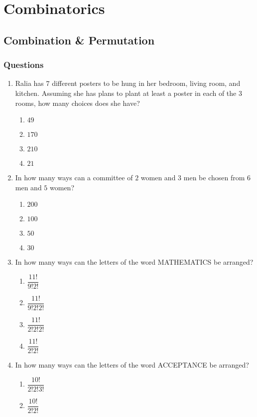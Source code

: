\chapter{Combinatorics}
\section{Combination \& Permutation}
\subsection{Questions}
\begin{multicols}{2}
\begin{enumerate}[label={\arabic*.}]
\item Ralia has \(7\) different posters to be hung in her bedroom, living room, and kitchen. Assuming she has plans to plant at least a poster in each of the \(3\) rooms, how many choices does she have?
	\begin{enumerate}[label={\Alph*.}]
	\item \(49\)
	\item \(170\)
	\item \(210\)
	\item \(21\)
	\end{enumerate}
\item In how many ways can a committee of \(2\) women and \(3\) men be chosen from \(6\) men and \(5\) women?
	\begin{enumerate}[label={\Alph*.}]
	\item \(200\)
	\item \(100\)
	\item \(50\)
	\item \(30\)
	\end{enumerate}
\item In how many ways can the letters of the word MATHEMATICS be arranged?
	\begin{enumerate}[label={\Alph*.}]
	\item \(\dfrac{11!}{9!2!}\)
	\item \(\dfrac{11!}{9!2!2!}\)
	\item \(\dfrac{11!}{2!2!2!}\)
	\item \(\dfrac{11!}{2!2!}\)
	\end{enumerate}
\item In how many ways can the letters of the word ACCEPTANCE be arranged?
	\begin{enumerate}[label={\Alph*.}]
	\item \(\dfrac{10!}{2!2!3!}\)
	\item \(\dfrac{10!}{2!2!}\)

\end{enumerate}
\end{enumerate}
\end{multicols}
